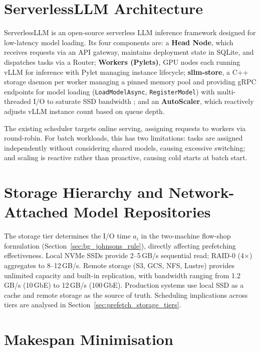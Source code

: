 \documentclass[logo,bsc,singlespacing,parskip,online]{infthesis}
\begin{document}
\section{ServerlessLLM Architecture}
\label{sec:bg_serverlessllm}

ServerlessLLM \citep{fu2024serverlessllm} is an open-source serverless LLM inference framework designed for low-latency model loading. Its four components are: a \textbf{Head Node}, which receives requests via an API gateway, maintains deployment state in SQLite, and dispatches tasks via a Router; \textbf{Workers (Pylets)}, GPU nodes each running vLLM for inference with Pylet managing instance lifecycle; \textbf{sllm-store}, a C++ storage daemon per worker managing a pinned memory pool and providing gRPC endpoints for model loading (\texttt{LoadModelAsync}, \texttt{RegisterModel}) with multi-threaded I/O to saturate SSD bandwidth \citep{grpc2024}; and an \textbf{AutoScaler}, which reactively adjusts vLLM instance count based on queue depth.

The existing scheduler targets online serving, assigning requests to workers via round-robin. For batch workloads, this has two limitations: tasks are assigned independently without considering shared models, causing excessive switching; and scaling is reactive rather than proactive, causing cold starts at batch start.

\section{Storage Hierarchy and Network-Attached Model Repositories}
\label{sec:bg_storage_hierarchy}

The storage tier determines the I/O time $a_i$ in the two-machine flow-shop formulation (Section~\ref{sec:bg_johnsons_rule}), directly affecting prefetching effectiveness. Local NVMe SSDs provide 2--5\,GB/s sequential read; RAID-0 (4$\times$) aggregates to 8--12\,GB/s. Remote storage (S3, GCS, NFS, Lustre) provides unlimited capacity and built-in replication, with bandwidth ranging from 1.2\,GB/s (10\,GbE) to 12\,GB/s (100\,GbE). Production systems use local SSD as a cache and remote storage as the source of truth. Scheduling implications across tiers are analysed in Section~\ref{sec:prefetch_storage_tiers}.

\section{Makespan Minimisation}
\label{sec:bg_makespan}
\end{document}
